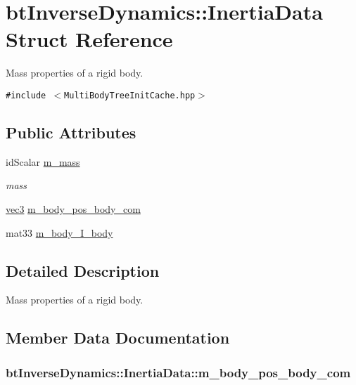 \hypertarget{structbt_inverse_dynamics_1_1_inertia_data}{
\section{btInverseDynamics::InertiaData Struct Reference}
\label{structbt_inverse_dynamics_1_1_inertia_data}
}
Mass properties of a rigid body.  


{\tt \#include $<$MultiBodyTreeInitCache.hpp$>$}

\subsection*{Public Attributes}
\begin{CompactItemize}
\item 
\hypertarget{structbt_inverse_dynamics_1_1_inertia_data_7fae541ff8201921ef5cd1180dd151e8}{
idScalar \hyperlink{structbt_inverse_dynamics_1_1_inertia_data_7fae541ff8201921ef5cd1180dd151e8}{m\_\-mass}}
\label{structbt_inverse_dynamics_1_1_inertia_data_7fae541ff8201921ef5cd1180dd151e8}

\begin{CompactList}\small\item\em mass \item\end{CompactList}\item 
\hyperlink{classbt_inverse_dynamics_1_1vec3}{vec3} \hyperlink{structbt_inverse_dynamics_1_1_inertia_data_f55b6b71b418109e2c91d37fef2381c1}{m\_\-body\_\-pos\_\-body\_\-com}
\item 
mat33 \hyperlink{structbt_inverse_dynamics_1_1_inertia_data_8812049a71e4002728f5be9d75155fea}{m\_\-body\_\-I\_\-body}
\end{CompactItemize}


\subsection{Detailed Description}
Mass properties of a rigid body. 

\subsection{Member Data Documentation}
\hypertarget{structbt_inverse_dynamics_1_1_inertia_data_f55b6b71b418109e2c91d37fef2381c1}{
\subsubsection[m\_\-body\_\-pos\_\-body\_\-com]{ {\bf btInverseDynamics::InertiaData::m\_\-body\_\-pos\_\-body\_\-com}}}
\label{structbt_inverse_dynamics_1_1_inertia_data_f55b6b71b418109e2c91d37fef2381c1}


